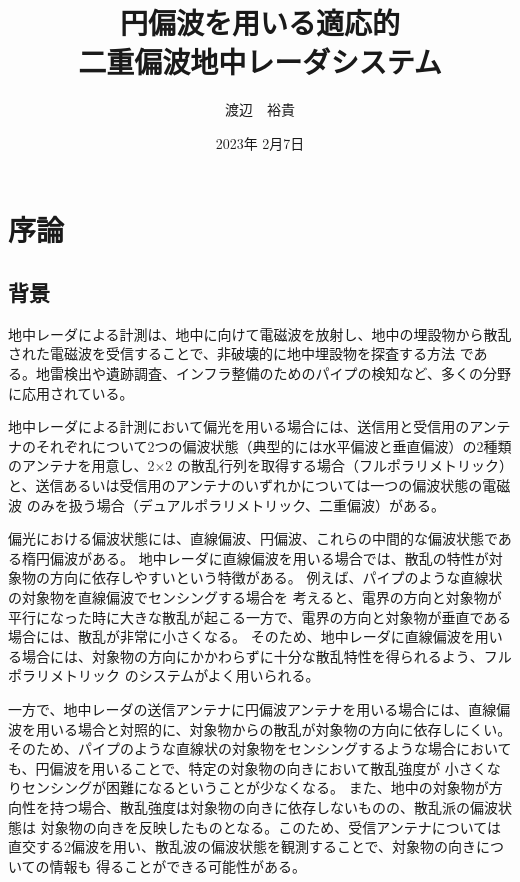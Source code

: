 \documentclass[11pt,a4paper,uplatex]{ujarticle}
\title{円偏波を用いる適応的\\二重偏波地中レーダシステム}
\date{2023年 2月7日}
\author{渡辺　裕貴}
\begin{document}
\maketitle
\newpage
\tableofcontents
\newpage
\section{序論}

  \subsection{背景}\label{sec:background}

  地中レーダによる計測は、地中に向けて電磁波を放射し、地中の埋設物から散乱された電磁波を受信することで、非破壊的に地中埋設物を探査する方法
  である。地雷検出や遺跡調査、インフラ整備のためのパイプの検知など、多くの分野に応用されている\cite{landmine_example}\cite{remains_example}。

  地中レーダによる計測において偏光を用いる場合には、送信用と受信用のアンテナのそれぞれについて2つの偏波状態（典型的には水平偏波と垂直偏波）の2種類のアンテナを用意し、2$\times$2
  の散乱行列を取得する場合（フルポラリメトリック）と、送信あるいは受信用のアンテナのいずれかについては一つの偏波状態の電磁波
  のみを扱う場合（デュアルポラリメトリック、二重偏波）がある。

  偏光における偏波状態には、直線偏波、円偏波、これらの中間的な偏波状態である楕円偏波がある。
  地中レーダに直線偏波を用いる場合では、散乱の特性が対象物の方向に依存しやすいという特徴がある。
  例えば、パイプのような直線状の対象物を直線偏波でセンシングする場合を
  考えると、電界の方向と対象物が平行になった時に大きな散乱が起こる一方で、電界の方向と対象物が垂直である場合には、散乱が非常に小さくなる。
  そのため、地中レーダに直線偏波を用いる場合には、対象物の方向にかかわらずに十分な散乱特性を得られるよう、フルポラリメトリック
  のシステムがよく用いられる。

  一方で、地中レーダの送信アンテナに円偏波アンテナを用いる場合には、直線偏波を用いる場合と対照的に、対象物からの散乱が対象物の方向に依存しにくい。
  そのため、パイプのような直線状の対象物をセンシングするような場合においても、円偏波を用いることで、特定の対象物の向きにおいて散乱強度が
  小さくなりセンシングが困難になるということが少なくなる。
  また、地中の対象物が方向性を持つ場合、散乱強度は対象物の向きに依存しないものの、散乱派の偏波状態は
  対象物の向きを反映したものとなる。このため、受信アンテナについては直交する2偏波を用い、散乱波の偏波状態を観測することで、対象物の向きについての情報も
  得ることができる可能性がある。
  
\end{document}
